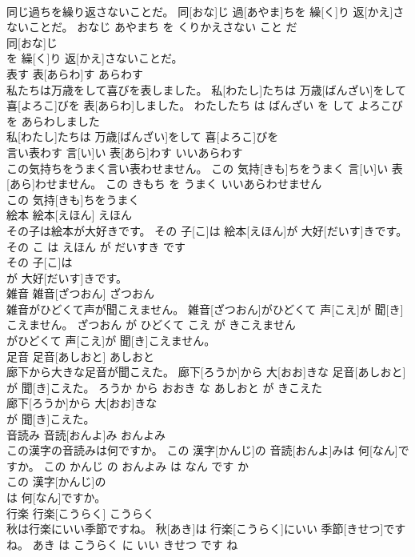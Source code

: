 \documentclass[8pt]{extreport}
\begin{document}
\begin{CJK}{UTF8}{min}
\\	同じ過ちを繰り返さないことだ。	同[おな]じ 過[あやま]ちを 繰[く]り 返[かえ]さないことだ。	おなじ あやまち を くりかえさない こと だ	
\\	同[おな]じ
\\	を 繰[く]り 返[かえ]さないことだ。			
\\	表す	表[あらわ]す	あらわす	
\\	私たちは万歳をして喜びを表しました。	私[わたし]たちは 万歳[ばんざい]をして 喜[よろこ]びを 表[あらわ]しました。	わたしたち は ばんざい を して よろこび を あらわしました	
\\	私[わたし]たちは 万歳[ばんざい]をして 喜[よろこ]びを
\\	言い表わす	言[い]い 表[あら]わす	いいあらわす	
\\	この気持ちをうまく言い表わせません。	この 気持[きも]ちをうまく 言[い]い 表[あら]わせません。	この きもち を うまく いいあらわせません	
\\	この 気持[きも]ちをうまく
\\	絵本	絵本[えほん]	えほん	
\\	その子は絵本が大好きです。	その 子[こ]は 絵本[えほん]が 大好[だいす]きです。	その こ は えほん が だいすき です	
\\	その 子[こ]は
\\	が 大好[だいす]きです。			
\\	雑音	雑音[ざつおん]	ざつおん	
\\	雑音がひどくて声が聞こえません。	雑音[ざつおん]がひどくて 声[こえ]が 聞[き]こえません。	ざつおん が ひどくて こえ が きこえません	
\\	がひどくて 声[こえ]が 聞[き]こえません。			
\\	足音	足音[あしおと]	あしおと	
\\	廊下から大きな足音が聞こえた。	廊下[ろうか]から 大[おお]きな 足音[あしおと]が 聞[き]こえた。	ろうか から おおき な あしおと が きこえた	
\\	廊下[ろうか]から 大[おお]きな
\\	が 聞[き]こえた。			
\\	音読み	音読[おんよ]み	おんよみ	
\\	この漢字の音読みは何ですか。	この 漢字[かんじ]の 音読[おんよ]みは 何[なん]ですか。	この かんじ の おんよみ は なん です か	
\\	この 漢字[かんじ]の
\\	は 何[なん]ですか。			
\\	行楽	行楽[こうらく]	こうらく	
\\	秋は行楽にいい季節ですね。	秋[あき]は 行楽[こうらく]にいい 季節[きせつ]ですね。	あき は こうらく に いい きせつ です ね	

\end{CJK}
\end{document}
